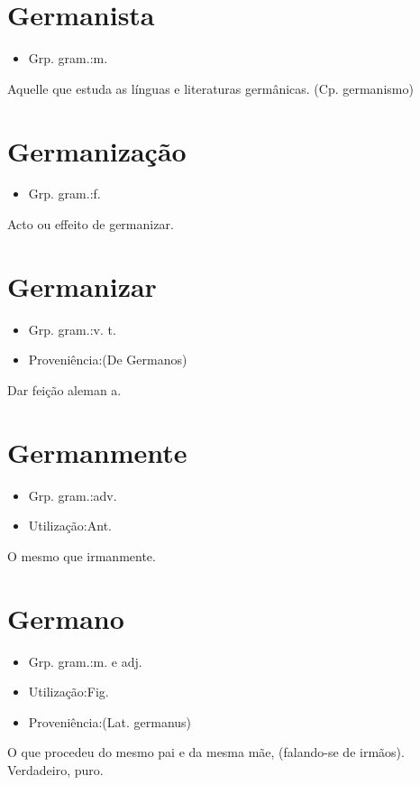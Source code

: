 \section{Germanista}
\begin{itemize}
\item {Grp. gram.:m.}
\end{itemize}
Aquelle que estuda as línguas e literaturas germânicas.
(Cp. \textunderscore germanismo\textunderscore )
\section{Germanização}
\begin{itemize}
\item {Grp. gram.:f.}
\end{itemize}
Acto ou effeito de germanizar.
\section{Germanizar}
\begin{itemize}
\item {Grp. gram.:v. t.}
\end{itemize}
\begin{itemize}
\item {Proveniência:(De \textunderscore Germanos\textunderscore )}
\end{itemize}
Dar feição aleman a.
\section{Germanmente}
\begin{itemize}
\item {Grp. gram.:adv.}
\end{itemize}
\begin{itemize}
\item {Utilização:Ant.}
\end{itemize}
O mesmo que \textunderscore irmanmente\textunderscore .
\section{Germano}
\begin{itemize}
\item {Grp. gram.:m.  e  adj.}
\end{itemize}
\begin{itemize}
\item {Utilização:Fig.}
\end{itemize}
\begin{itemize}
\item {Proveniência:(Lat. \textunderscore germanus\textunderscore )}
\end{itemize}
O que procedeu do mesmo pai e da mesma mãe, (falando-se de irmãos).
Verdadeiro, puro.
